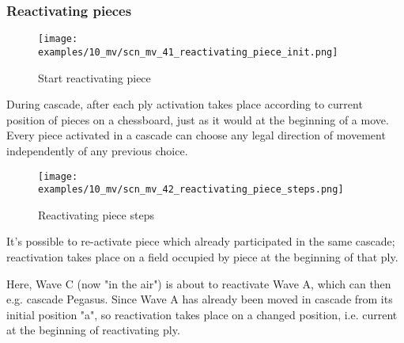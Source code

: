 \clearpage %

\subsubsection*{Reactivating pieces}
\label{sec:Miranda's veil/Wave/Cascading Waves/Reactivating pieces}

\vspace*{-1.4\baselineskip}
\noindent
\begin{figure}[!h]
\texttt{[image: examples/10\_mv/scn\_mv\_41\_reactivating\_piece\_init.png]}
\caption{Start reactivating piece}
\label{fig:scn_mv_41_reactivating_piece_init}
\end{figure}

During cascade, after each ply activation takes place according to current position
of pieces on a chessboard, just as it would at the beginning of a move. Every piece
activated in a cascade can choose any legal direction of movement independently of
any previous choice.

\clearpage %

\vspace*{-2.1\baselineskip}
\noindent
\begin{figure}[!h]
\texttt{[image: examples/10\_mv/scn\_mv\_42\_reactivating\_piece\_steps.png]}
\vspace*{-1.3\baselineskip}
\caption{Reactivating piece steps}
\label{fig:scn_mv_42_reactivating_piece_steps}
\end{figure}

\vspace*{-0.3\baselineskip}
It's possible to re-activate piece which already participated in the same cascade;
reactivation takes place on a field occupied by piece at the beginning of that ply.

Here, Wave C (now "in the air") is about to reactivate Wave A, which can then e.g.
cascade Pegasus. Since Wave A has already been moved in cascade from its initial
position "a", so reactivation takes place on a changed position, i.e. current at
the beginning of reactivating ply.

